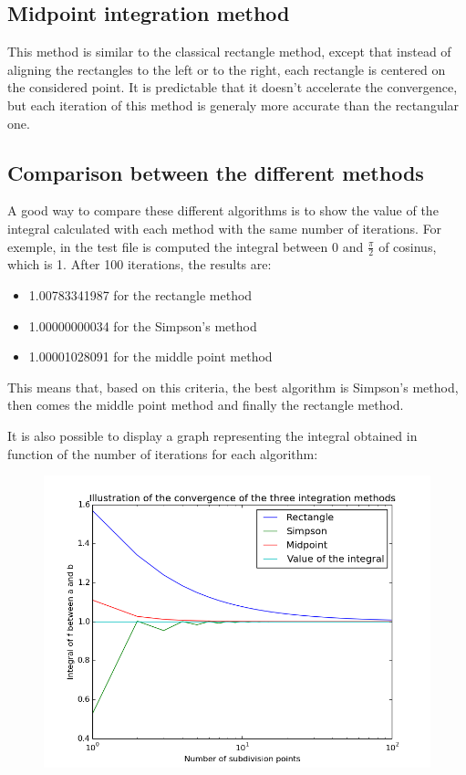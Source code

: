 \documentclass{article}
\begin{document}
\subsection{Midpoint integration method}
This method is similar to the classical rectangle method, except that instead of aligning the rectangles to the left or to the right, each rectangle is centered on the considered point. It is predictable that it doesn't accelerate the convergence, but each iteration of this method is generaly more accurate than the rectangular one.

\subsection{Comparison between the different methods}

A good way to compare these different algorithms is to show the value of the integral calculated with each method with the same number of iterations. For exemple, in the test file is computed the integral between $0$ and $\frac{\pi}{2}$ of cosinus, which is 1. After 100 iterations, the results are:
\begin{itemize}
\item 1.00783341987 for the rectangle method
\item 1.00000000034 for the Simpson's method
\item 1.00001028091 for the middle point method
\end{itemize}
This means that, based on this criteria, the best algorithm is Simpson's method, then comes the middle point method and finally the rectangle method.
\newpage

It is also possible to display a graph representing the integral obtained in function of the number of iterations for each algorithm:

\begin{figure}[h]
  \includegraphics[width=12cm]{cosinus_integration}
\end{figure}
\end{document}
